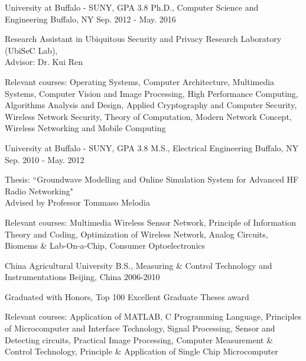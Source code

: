 \begin{cventries}
  \cventry
      {University at Buffalo - SUNY, GPA 3.8}
    {Ph.D., Computer Science and Engineering}
    {Buffalo, NY}
    {Sep. 2012 - May. 2016}
    {
      \begin{cvitems}
        \item {Research Assistant in Ubiquitous Security and Privacy Research Laboratory
(UbiSeC Lab), \\ 
Advisor: Dr. Kui Ren}
 \item {Relevant courses: Operating Systems, Computer Architecture, Multimedia Systems, Computer Vision and Image Processing, High Performance Computing, Algorithms Analysis and Design, Applied Cryptography and Computer Security, Wireless Network Security, Theory of Computation, Modern Network Concept, Wireless Networking and Mobile Computing}
      \end{cvitems}
    }
\end{cventries}
\begin{cventries}
  \cventry
      {University at Buffalo - SUNY, GPA 3.8}
    {M.S., Electrical Engineering}
    {Buffalo, NY}
    {Sep. 2010 - May. 2012}
    {
      \begin{cvitems}
	 \item{Thesis: ``Groundwave Modelling and Online Simulation System for Advanced HF Radio Networking" \\
Advised by Professor Tommaso Melodia}
	 \item{Relevant courses: Multimedia Wireless Sensor Network, Principle of Information Theory and Coding, Optimization of Wireless Network, Analog Circuits, Biomems \& Lab-On-a-Chip, Consumer Optoelectronics}
      \end{cvitems}
    }
\end{cventries}
\begin{cventries}
  \cventry
    {China Agricultural University}
        {B.S., Measuring \& Control Technology and Instrumentations}
    {Beijing, China}
    {2006-2010}
    {
      \begin{cvitems}
\item{Graduated with Honors, Top 100 Excellent Graduate Theses award}
		\item{Relevant courses: Application of MATLAB, C Programming Language, Principles of Microcomputer and Interface Technology, Signal Processing, Sensor and Detecting circuits, Practical Image Processing, Computer Measurement \& Control Technology, Principle \& Application of Single Chip Microcomputer}      \end{cvitems}
    }
\end{cventries}
